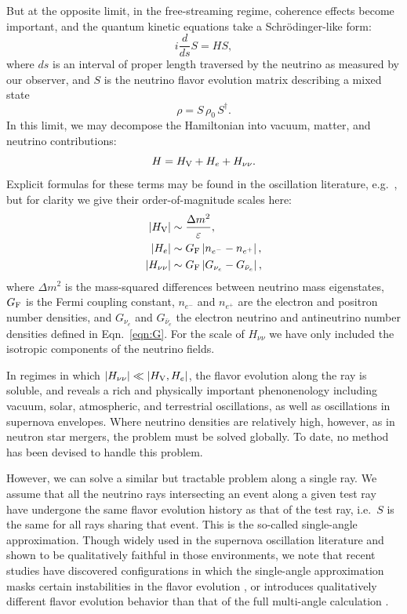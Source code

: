 \documentclass[aps,floatfix,prd,superscriptaddress,twocolumn]{revtex4-1}
\begin{document}
But at the opposite limit, in the free-streaming regime,
coherence effects become important,
and the quantum kinetic equations take a Schr\"{o}dinger-like form:
\begin{equation}
  \label{eqn:schroedinger}
  i \frac{d}{ds} S = H S,
\end{equation}
where $ds$ is an interval of proper length traversed by the neutrino as
measured by our observer, and
$S$ is the neutrino flavor evolution matrix describing a mixed state
\begin{equation}
  \label{eq:density_evolution}
  \rho = S \, \rho_0 \, S^\dagger.
\end{equation}
In this limit, we may decompose the Hamiltonian into vacuum,
matter, and neutrino contributions:
\begin{equation}
  \label{eqn:decompose_H}
  H = H_{\rm V} + H_e + H_{\nu\nu}.
\end{equation}
Explicit formulas for these terms may be found in the oscillation literature,
e.g.\ \cite{duan2009-review},
but for clarity we give their order-of-magnitude scales here:
\begin{align}
  \label{eqn:scale_H_V}
  |H_{\rm V}| &\sim \frac{\Delta m^2}{\varepsilon}, \\
  \label{eqn:scale_H_e}
  |H_e|       &\sim G_{\rm F}\left|n_{e^-}-n_{e^+}\right|, \\
  \label{eqn:scale_H_nunu}
  |H_{\nu\nu}|&\sim G_{\rm F} \left|G_{\nu_e}-G_{\bar{\nu}_e}\right|,
\end{align}
where $\Delta m^2$ is the mass-squared differences between neutrino mass
eigenstates,
$G_{\rm F}$ is the Fermi coupling constant,
$n_{e^-}$ and $n_{e^+}$ are the electron and positron number densities,
and $G_{\nu_e}$ and $G_{\bar{\nu}_e}$ the electron neutrino and antineutrino
number densities defined in Eqn.~\ref{eqn:G}.
For the scale of $H_{\nu\nu}$ we have only included the isotropic
components of the neutrino fields.

In regimes in which $|H_{\nu\nu}|\ll|H_{\rm V},H_e|$,
the flavor evolution along the ray is soluble, and reveals a rich
and physically important phenonenology including
vacuum, solar, atmospheric, and terrestrial oscillations,
as well as oscillations in supernova envelopes.
Where neutrino densities are relatively high, however,
as in neutron star mergers, the problem must be solved globally.
To date, no method has been devised to handle this problem.

However, we can solve a similar but tractable problem along a single ray.
We assume that all the neutrino rays intersecting an event along a given test ray
have undergone the same flavor evolution history as that of the test ray,
i.e.\ $S$ is the same for all rays sharing that event.
This is the so-called single-angle approximation.
Though widely used in the supernova oscillation literature
and shown to be qualitatively faithful in those environments,
we note that recent studies have discovered configurations in which
the single-angle approximation masks certain instabilities
in the flavor evolution \cite{wu2017-fast_neutrino_conversions},
or introduces qualitatively different flavor evolution behavior
than that of the full multi-angle calculation \cite{vlas2018-multiangle}.
\end{document}
